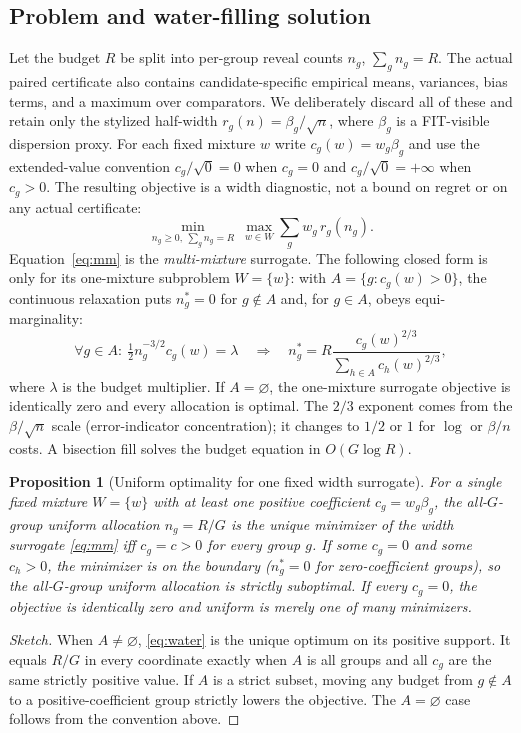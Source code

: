 \documentclass{article}
\newtheorem{proposition}{Proposition}
\begin{document}
\subsection{Problem and water-filling solution}
Let the budget $R$ be split into per-group reveal counts $n_g$, $\sum_g n_g=R$. The actual
paired certificate also contains candidate-specific empirical means, variances, bias terms,
and a maximum over comparators. We deliberately discard all of these and retain only the
stylized half-width $r_g(n)=\beta_g/\sqrt n$, where $\beta_g$ is a FIT-visible dispersion
proxy. For each fixed mixture $w$ write $c_g(w)=w_g\beta_g$ and use the extended-value convention
$c_g/\sqrt{0}=0$ when $c_g=0$ and $c_g/\sqrt{0}=+\infty$ when $c_g>0$. The resulting
objective is a width diagnostic, not a bound on regret or on any actual certificate:
\begin{equation*}
  \min_{n_g\ge0,\ \sum_g n_g=R}\ \max_{w\in W}\sum_g w_g\,r_g(n_g).
  \tag{WS}\label{eq:mm}
\end{equation*}
Equation~\eqref{eq:mm} is the \emph{multi-mixture} surrogate. The following closed form is
only for its one-mixture subproblem $W=\{w\}$: with $A=\{g:c_g(w)>0\}$, the continuous
relaxation puts $n_g^*=0$ for $g\notin A$ and, for $g\in A$, obeys equi-marginality:
\begin{equation}
  \forall g\in A:\ \tfrac12 n_g^{-3/2}c_g(w)=\lambda
  \quad\Longrightarrow\quad
  n_g^*=R\frac{c_g(w)^{2/3}}{\sum_{h\in A}c_h(w)^{2/3}},
  \label{eq:water}
\end{equation}
where $\lambda$ is the budget multiplier. If $A=\varnothing$, the one-mixture surrogate
objective is identically zero and every allocation is optimal.
The $2/3$ exponent comes from the $\beta/\sqrt n$ scale (error-indicator concentration); it
changes to $1/2$ or $1$ for $\log$ or $\beta/n$ costs. A bisection fill solves the budget
equation in $O(G\log R)$.

\begin{proposition}[Uniform optimality for one fixed width surrogate]
\label{prop:uniform-opt}
For a \emph{single fixed} mixture $W=\{w\}$ with at least one positive coefficient
$c_g=w_g\beta_g$, the all-$G$-group uniform allocation $n_g=R/G$ is the unique minimizer of
the width surrogate \eqref{eq:mm} iff $c_g=c>0$ for \emph{every} group $g$. If some $c_g=0$
and some $c_h>0$, the minimizer is on the boundary ($n_g^*=0$ for zero-coefficient groups), so
the all-$G$-group uniform allocation is strictly suboptimal. If every $c_g=0$, the objective is
identically zero and uniform is merely one of many minimizers.
\end{proposition}
\begin{proof}[Sketch]
When $A\ne\varnothing$, \eqref{eq:water} is the unique optimum on its positive support.
It equals $R/G$ in every coordinate exactly when $A$ is all groups and all $c_g$ are the same
strictly positive value. If $A$ is a strict subset, moving any budget from $g\notin A$ to a
positive-coefficient group strictly lowers the objective. The $A=\varnothing$ case follows
from the convention above.
\end{proof}
\end{document}
